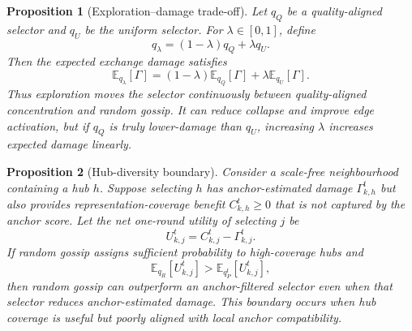 \documentclass[conference]{IEEEtran}
\newtheorem{proposition}{Proposition}
\begin{document}
\begin{proposition}[Exploration--damage trade-off]
\label{prop:exploration_damage_tradeoff}
Let \(q_Q\) be a quality-aligned selector and \(q_U\) be the uniform selector. For \(\lambda\in[0,1]\), define
\[
q_{\lambda}
=
(1-\lambda)q_Q+\lambda q_U.
\]
Then the expected exchange damage satisfies
\begin{equation*}
\mathbb{E}_{q_\lambda}[\Gamma]
=
(1-\lambda)\mathbb{E}_{q_Q}[\Gamma]
+
\lambda\mathbb{E}_{q_U}[\Gamma].
\end{equation*}
Thus exploration moves the selector continuously between quality-aligned concentration and random gossip. It can reduce collapse and improve edge activation, but if \(q_Q\) is truly lower-damage than \(q_U\), increasing \(\lambda\) increases expected damage linearly.
\end{proposition}

\begin{proposition}[Hub-diversity boundary]
\label{prop:hub_diversity_boundary}
Consider a scale-free neighbourhood containing a hub \(h\). Suppose selecting \(h\) has anchor-estimated damage \(\Gamma_{k,h}^t\) but also provides representation-coverage benefit \(C_{k,h}^t\geq0\) that is not captured by the anchor score. Let the net one-round utility of selecting \(j\) be
\[
U_{k,j}^t
=
C_{k,j}^t-\Gamma_{k,j}^t .
\]
If random gossip assigns sufficient probability to high-coverage hubs and
\begin{equation*}
\mathbb{E}_{q_R}[U_{k,j}^t]
>
\mathbb{E}_{q_P^t}[U_{k,j}^t],
\end{equation*}
then random gossip can outperform an anchor-filtered selector even when that selector reduces anchor-estimated damage. This boundary occurs when hub coverage is useful but poorly aligned with local anchor compatibility.
\end{proposition}
\end{document}
